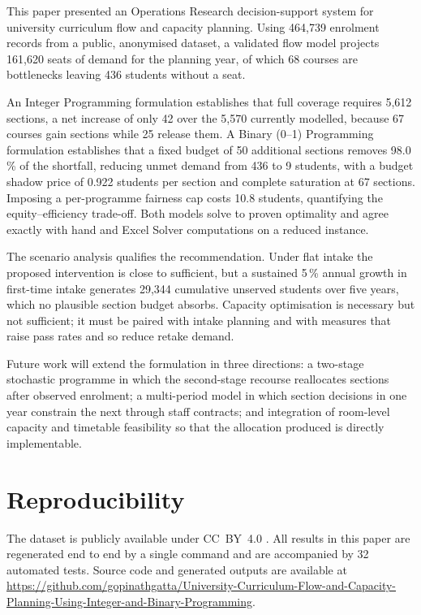 \documentclass[conference]{IEEEtran}
\begin{document}
This paper presented an Operations Research decision-support system for university
curriculum flow and capacity planning. Using 464{,}739 enrolment records from a public,
anonymised dataset, a validated flow model projects 161{,}620 seats of demand for the
planning year, of which 68 courses are bottlenecks leaving 436 students without a seat.

An Integer Programming formulation establishes that full coverage requires 5{,}612
sections, a net increase of only 42 over the 5{,}570 currently modelled, because 67
courses gain sections while 25 release them. A Binary (0--1) Programming formulation
establishes that a fixed budget of 50 additional sections removes 98.0\,\% of the
shortfall, reducing unmet demand from 436 to 9 students, with a budget shadow price of
0.922 students per section and complete saturation at 67 sections. Imposing a
per-programme fairness cap costs 10.8 students, quantifying the equity--efficiency
trade-off. Both models solve to proven optimality and agree exactly with hand and Excel
Solver computations on a reduced instance.

The scenario analysis qualifies the recommendation. Under flat intake the proposed
intervention is close to sufficient, but a sustained 5\,\% annual growth in first-time
intake generates 29{,}344 cumulative unserved students over five years, which no
plausible section budget absorbs. Capacity optimisation is necessary but not sufficient;
it must be paired with intake planning and with measures that raise pass rates and so
reduce retake demand.

Future work will extend the formulation in three directions: a two-stage stochastic
programme in which the second-stage recourse reallocates sections after observed
enrolment; a multi-period model in which section decisions in one year constrain the
next through staff contracts; and integration of room-level capacity and timetable
feasibility so that the allocation produced is directly implementable.

\section*{Reproducibility}

The dataset is publicly available under CC~BY~4.0 \cite{zenodo}. All results in this
paper are regenerated end to end by a single command and are accompanied by 32 automated
tests. Source code and generated outputs are available at
\url{https://github.com/gopinathgatta/University-Curriculum-Flow-and-Capacity-Planning-Using-Integer-and-Binary-Programming}.
\end{document}
